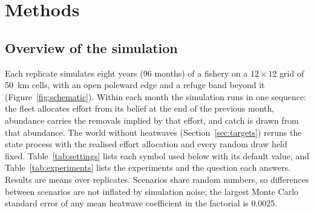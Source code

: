 \documentclass[11pt,a4paper]{article}
\begin{document}
\section{Methods}

\subsection{Overview of the simulation}

Each replicate simulates eight years (96 months) of a fishery on a $12\times12$ grid of 50~km cells, with an open poleward edge and a refuge band beyond it (Figure~\ref{fig:schematic}). Within each month the simulation runs in one sequence: the fleet allocates effort from its belief at the end of the previous month, abundance carries the removals implied by that effort, and catch is drawn from that abundance. The world without heatwaves (Section~\ref{sec:targets}) reruns the state process with the realised effort allocation and every random draw held fixed. Table~\ref{tab:settings} lists each symbol used below with its default value, and Table~\ref{tab:experiments} lists the experiments and the question each answers. Results are means over replicates. Scenarios share random numbers, so differences between scenarios are not inflated by simulation noise; the largest Monte Carlo standard error of any mean heatwave coefficient in the factorial is 0.0025.
\end{document}
